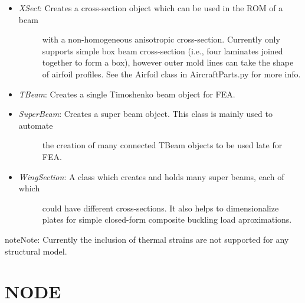\documentclass[letterpaper,10pt,english]{sphinxmanual}
\begin{document}
\begin{itemize}
\begin{description}
\end{description}

\item {} \begin{description}
\item[{\emph{XSect}: Creates a cross-section object which can be used in the ROM of a beam}] \leavevmode
with a non-homogeneous anisotropic cross-section. Currently only supports
simple box beam cross-section (i.e., four laminates joined together to form
a box), however outer mold lines can take the shape of airfoil profiles.
See the Airfoil class in AircraftParts.py for more info.

\end{description}

\item {} 
\emph{TBeam}: Creates a single Timoshenko beam object for FEA.

\item {} \begin{description}
\item[{\emph{SuperBeam}: Creates a super beam object. This class is mainly used to automate}] \leavevmode
the creation of many connected TBeam objects to be used late for FEA.

\end{description}

\item {} \begin{description}
\item[{\emph{WingSection}: A class which creates and holds many super beams, each of which}] \leavevmode
could have different cross-sections. It also helps to dimensionalize
plates for simple closed-form composite buckling load aproximations.

\end{description}

\end{itemize}

\begin{notice}{note}{Note:}
Currently the inclusion of thermal strains are not supported for any
structural model.
\end{notice}
\label{structures:module-AeroComBAT.Structures}

\section{NODE}
\label{structures:node}
\end{document}
